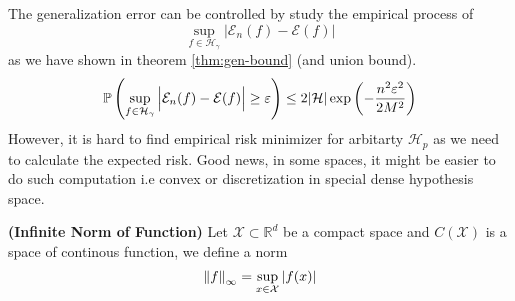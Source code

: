 \begin{remark}
    The generalization error can be controlled by study the empirical process of 
    \begin{equation*}
        \sup_{f\in\mathcal{H}_\gamma}| \mathcal{E}_n(f) - \mathcal{E}(f)|
    \end{equation*}
    as we have shown in theorem \ref{thm:gen-bound} (and union bound). 
    \begin{equation*}
        \mathbb{P}\left( \sup_{f\in\mathcal{H}_\gamma}\Big| \mathcal{E}_n(f) - \mathcal{E}(f)\Big| \ge \varepsilon \right) \le 2|\mathcal{H}|\exp\left( -\frac{n^2\varepsilon^2}{2M^2} \right)
    \end{equation*}
    However, it is hard to find empirical risk minimizer for arbitarty $ \mathcal{H}_p$ as we need to calculate the expected risk. Good news, in some spaces, it might be easier to do such computation i.e convex or discretization in special dense hypothesis space.
\end{remark}

\begin{definition}{\textbf{(Infinite Norm of Function)}}
    Let $\mathcal{X}\subset \mathbb{R}^d$ be a compact space and $C(\mathcal{X})$ is a space of continous function, we define a norm 
    \begin{equation*}
        \left\lVert f\right\rVert_\infty = \sup_{x\in\mathcal{X} }|f(x)|
    \end{equation*}
\end{definition}

